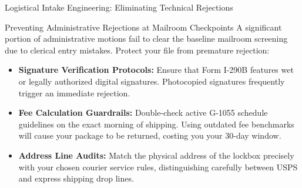 \documentclass[11pt]{beamer}
\begin{document}
	\begin{frame}{Logistical Intake Engineering: Eliminating Technical Rejections}
		\scriptsize
		\begin{block}{Preventing Administrative Rejections at Mailroom Checkpoints}
			A significant portion of administrative motions fail to clear the baseline mailroom screening due to clerical entry mistakes. Protect your file from premature rejection:
			\begin{itemize}
				\item \textbf{Signature Verification Protocols:} Ensure that Form I-290B features wet or legally authorized digital signatures. Photocopied signatures frequently trigger an immediate rejection.
				\item \textbf{Fee Calculation Guardrails:} Double-check active G-1055 schedule guidelines on the exact morning of shipping. Using outdated fee benchmarks will cause your package to be returned, costing you your 30-day window.
				\item \textbf{Address Line Audits:} Match the physical address of the lockbox precisely with your chosen courier service rules, distinguishing carefully between USPS and express shipping drop lines.
			\end{itemize}
		\end{block}
	\end{frame}
	
	
\end{document}
